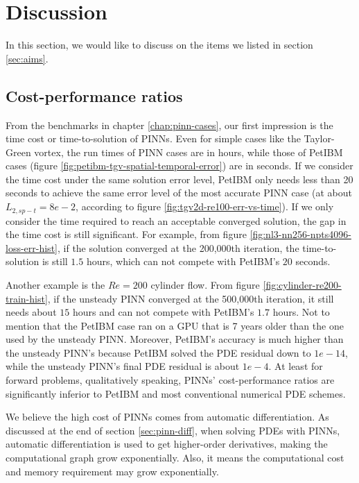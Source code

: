
\section{Discussion}

In this section, we would like to discuss on the items we listed in section \ref{sec:aims}.

\subsection*{Cost-performance ratios}

From the benchmarks in chapter \ref{chap:pinn-cases}, our first impression is the time cost or time-to-solution of PINNs.
Even for simple cases like the Taylor-Green vortex, the run times of PINN cases are in hours, while those of PetIBM cases (figure \ref{fig:petibm-tgv-spatial-temporal-error}) are in seconds.
If we consider the time cost under the same solution error level, PetIBM only needs less than 20 seconds to achieve the same error level of the most accurate PINN case (at about $L_{2,sp-t}=8e-2$, according to figure \ref{fig:tgv2d-re100-err-vs-time}).
If we only consider the time required to reach an acceptable converged solution, the gap in the time cost is still significant.
For example, from figure \ref{fig:nl3-nn256-npts4096-loss-err-hist}, if the solution converged at the 200,000th iteration, the time-to-solution is still $1.5$ hours, which can not compete with PetIBM's $20$ seconds.

Another example is the $Re=200$ cylinder flow.
From figure \ref{fig:cylinder-re200-train-hist}, if the unsteady PINN converged at the 500,000th iteration, it still needs about $15$ hours and can not compete with PetIBM's $1.7$ hours.
Not to mention that the PetIBM case ran on a GPU that is 7 years older than the one used by the unsteady PINN.
Moreover, PetIBM's accuracy is much higher than the unsteady PINN's because PetIBM solved the PDE residual down to $1e-14$, while the unsteady PINN's final PDE residual is about $1e-4$.
At least for forward problems, qualitatively speaking, PINNs' cost-performance ratios are significantly inferior to PetIBM and most conventional numerical PDE schemes.

We believe the high cost of PINNs comes from automatic differentiation.
As discussed at the end of section \ref{sec:pinn-diff}, when solving PDEs with PINNs, automatic differentiation is used to get higher-order derivatives, making the computational graph grow exponentially.
Also, it means the computational cost and memory requirement may grow exponentially.

